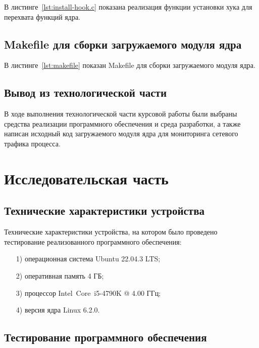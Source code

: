 \documentclass{bmstu}
\begin{document}
В листинге~\ref{lst:install-hook.c} показана реализация функции установки хука для перехвата функций ядра.


\section{Makefile для сборки загружаемого модуля ядра}

В листинге~\ref{lst:makefile} показан Makefile для сборки загружаемого модуля ядра.


\section*{Вывод из технологической части}

В ходе выполнения технологической части курсовой работы были выбраны средства реализации программного обеспечения и среда разработки, а также написан исходный код загружаемого модуля ядра для мониторинга сетевого трафика процесса.

\chapter{Исследовательская часть}

\section{Технические характеристики устройства}

Технические характеристики устройства, на котором было проведено тестирование реализованного программного обеспечения:
\begin{enumerate}
\item[1)]
операционная система Ubuntu 22.04.3 LTS;
\item[2)]
оперативная память 4 ГБ;
\item[3)]
процессор Intel\textregistered ~Core\texttrademark ~i5-4790K @ 4.00 ГГц;
\item[4)] версия ядра Linux 6.2.0.
\end{enumerate}

\section{Тестирование программного обеспечения}
\end{document}
